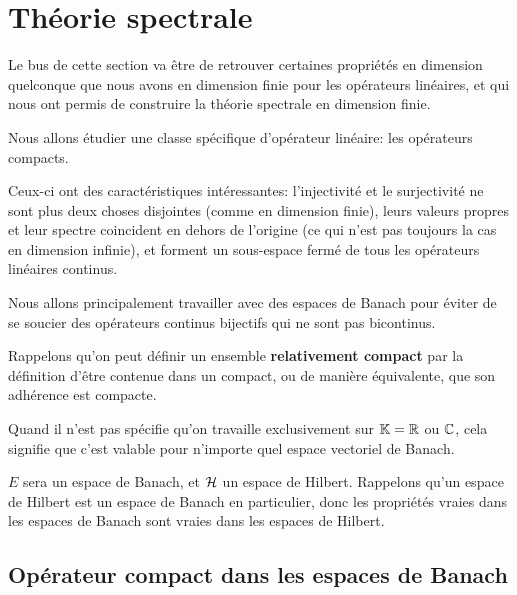 \section{Théorie spectrale}

Le bus de cette section va être de retrouver certaines propriétés en dimension
quelconque que nous avons en dimension finie pour les opérateurs linéaires, et
qui nous ont permis de construire la théorie spectrale en dimension finie.

Nous allons étudier une classe spécifique d'opérateur linéaire: les opérateurs
compacts.

Ceux-ci ont des caractéristiques intéressantes: l'injectivité et le surjectivité
ne sont plus deux choses disjointes (comme en dimension finie), leurs valeurs
propres et leur spectre coincident en dehors de l'origine (ce qui n'est pas
toujours la cas en dimension infinie), et forment un sous-espace fermé de tous
les opérateurs linéaires continus.

Nous allons principalement travailler avec des espaces de Banach pour éviter de
se soucier des opérateurs continus bijectifs qui ne sont pas bicontinus.




Rappelons qu'on peut définir un ensemble \textbf{relativement compact} par la
définition d'être contenue dans un compact, ou de manière équivalente, que son
adhérence est compacte.

Quand il n'est pas spécifie qu'on travaille exclusivement sur $\mathbb{K} =
\mathbb{R}$ ou $\mathbb{C}$, cela signifie que c'est valable pour n'importe quel espace
vectoriel de Banach.

$E$ sera un espace de Banach, et $\mathcal{H}$ un espace de Hilbert.  Rappelons
qu'un espace de Hilbert est un espace de Banach en particulier, donc les
propriétés vraies dans les espaces de Banach sont vraies dans les espaces de
Hilbert.

\subsection{Opérateur compact dans les espaces de Banach}

